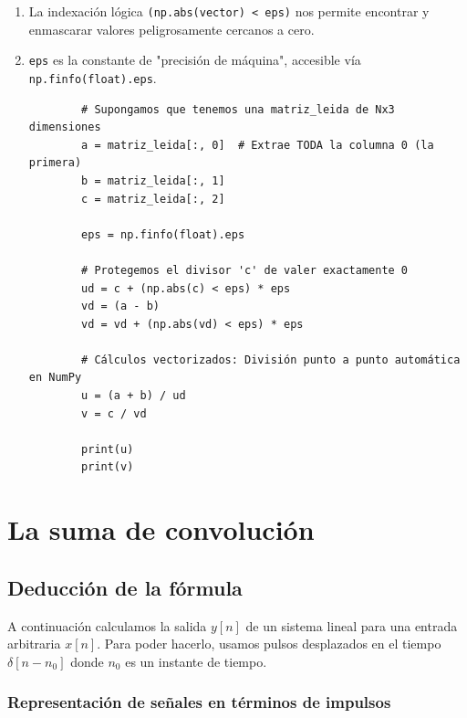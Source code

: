 \documentclass[11pt,a4paper,openany]{book}
\begin{document}
\begin{enumerate}
	\item La indexación lógica \verb-(np.abs(vector) < eps)- nos permite encontrar y enmascarar valores peligrosamente cercanos a cero.
	\item \texttt{eps} es la constante de "precisión de máquina", accesible vía \texttt{np.finfo(float).eps}.
	
	\begin{verbatim}
		# Supongamos que tenemos una matriz_leida de Nx3 dimensiones
		a = matriz_leida[:, 0]  # Extrae TODA la columna 0 (la primera)
		b = matriz_leida[:, 1]
		c = matriz_leida[:, 2]
		
		eps = np.finfo(float).eps
		
		# Protegemos el divisor 'c' de valer exactamente 0
		ud = c + (np.abs(c) < eps) * eps 
		vd = (a - b)
		vd = vd + (np.abs(vd) < eps) * eps
		
		# Cálculos vectorizados: División punto a punto automática en NumPy
		u = (a + b) / ud  
		v = c / vd        
		
		print(u)
		print(v)
	\end{verbatim}
\end{enumerate}
	
	
\chapter{La suma de convolución}

\section{Deducción de la fórmula}

A continuación calculamos la salida $y[n]$ de un sistema lineal para una entrada arbitraria $x[n]$. Para poder hacerlo, usamos pulsos desplazados en el tiempo $\delta[n-n_{0}]$ donde $n_{0}$ es un instante de tiempo.

\subsection{Representación de señales en términos de impulsos}
\end{document}
